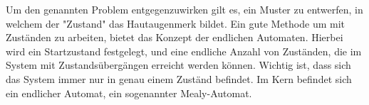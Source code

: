 Um den genannten Problem entgegenzuwirken gilt es, ein Muster zu entwerfen,
in welchem der "Zustand" das Hautaugenmerk bildet.
Ein gute Methode um mit Zuständen zu arbeiten, bietet das Konzept der endlichen Automaten.
Hierbei wird ein Startzustand festgelegt, und eine endliche Anzahl von Zuständen, die im System mit
Zustandsübergängen erreicht werden können. Wichtig ist, dass sich das System immer nur in genau
einem Zuständ befindet.
Im Kern befindet sich ein endlicher Automat, ein sogenannter Mealy-Automat.